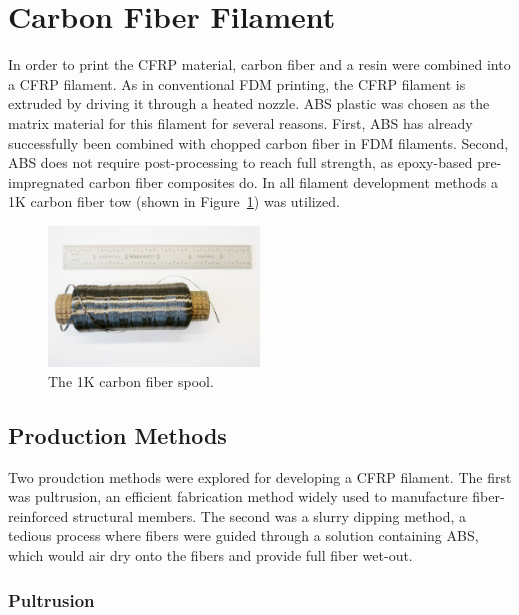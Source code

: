 \section{Carbon Fiber Filament}

\indent

In order to print the CFRP material, carbon fiber and a resin were combined into a CFRP filament. As in conventional FDM printing, the CFRP filament is extruded by driving it through a heated nozzle. ABS plastic was chosen as the matrix material for this filament for several reasons. First, ABS has already successfully been combined with chopped carbon fiber in FDM filaments. Second, ABS does not require post-processing to reach full strength, as epoxy-based pre-impregnated carbon fiber composites do. In all filament development methods a 1K carbon fiber tow (shown in Figure~\ref{fig:carbon-fiber-spool}) was utilized.\\

\begin{figure}[htp]
    \centering
    \includegraphics[width=0.5\textwidth]{./figures/carbon-fiber-spool}
    \caption{The 1K carbon fiber spool.}
    \label{fig:carbon-fiber-spool}
\end{figure}

\subsection{Production Methods}

\indent

Two proudction methods were explored for developing a CFRP filament. The first was pultrusion, an efficient fabrication method widely used to manufacture fiber-reinforced structural members. The second was a slurry dipping method, a tedious process where fibers were guided through a solution containing ABS, which would air dry onto the fibers and provide full fiber wet-out.\\

\subsubsection{Pultrusion}


